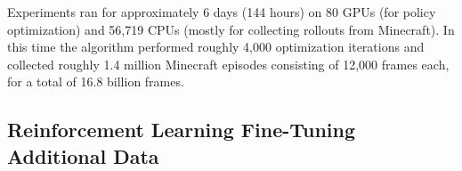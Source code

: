 
Experiments ran for approximately 6 days (144 hours) on 80 GPUs (for policy optimization) and 56,719 CPUs (mostly for collecting rollouts from Minecraft). In this time the algorithm performed roughly 4,000 optimization iterations and collected roughly 1.4 million Minecraft episodes consisting of 12,000 frames each, for a total of 16.8 billion frames.

\subsection{Reinforcement Learning Fine-Tuning Additional Data}
\label{Appendix:RLPreliminary}

